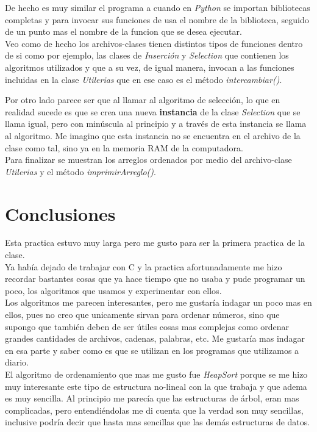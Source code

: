 \documentclass{article}
\begin{document}
			De hecho es muy similar el programa a cuando en \emph{Python} se importan bibliotecas completas y para invocar sus funciones de usa el nombre de la biblioteca, seguido de un punto mas el nombre de la funcion que se desea ejecutar.\\
			
			Veo como de hecho los archivos-clases tienen distintos tipos de funciones dentro de si como por ejemplo, las clases de \emph{Inserción} y \emph{Selection} que contienen los algoritmos utilizados y que a su vez, de igual manera, invocan a las funciones incluidas en la clase \emph{Utilerias} que en ese caso es el método \emph{intercambiar()}.
			
			Por otro lado parece ser que al llamar al algoritmo de selección, lo que en realidad sucede es que se crea una nueva \textbf{instancia} de la clase \emph{Selection} que se llama igual, pero con minúscula al principio y a través de esta instancia se llama al algoritmo. Me imagino que esta instancia no se encuentra en el archivo de la clase como tal, sino ya en la memoria RAM de la computadora.\\
			
			Para finalizar se muestran los arreglos ordenados por medio del archivo-clase \emph{Utilerias} y el método \emph{imprimirArreglo()}.
		
		\newpage  
	
	\section{Conclusiones}
	
	Esta practica estuvo muy larga pero me gusto para ser la primera practica de la clase.\\ 
	
	Ya había dejado de trabajar con C y la practica afortunadamente me hizo recordar bastantes cosas que ya hace tiempo que no usaba y pude programar un poco, los algoritmos que usamos y experimentar con ellos.\\
	
	Los algoritmos me parecen interesantes, pero me gustaría indagar un poco mas en ellos, pues no creo que unicamente sirvan para ordenar números, sino que supongo que también deben de ser útiles cosas mas complejas como ordenar grandes cantidades de archivos, cadenas, palabras, etc. Me gustaría mas indagar en esa parte y saber como es que se utilizan en los programas que utilizamos a diario.\\
	
	El algoritmo de ordenamiento que mas me gusto fue \emph{HeapSort} porque se me hizo muy interesante este tipo de estructura no-lineal con la que trabaja y que adema es muy sencilla. Al principio me parecía que las estructuras de árbol, eran mas complicadas, pero entendiéndolas me di cuenta que la verdad son muy sencillas, inclusive podría decir que hasta mas sencillas que las demás estructuras de datos.\\
	
\end{document}
